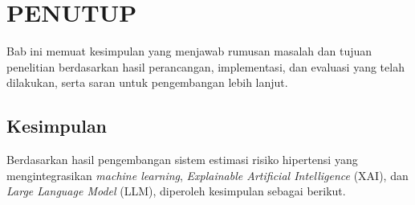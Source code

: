 \cleardoublepage
\chapter{PENUTUP}
\label{chap:penutup}

Bab ini memuat kesimpulan yang menjawab rumusan masalah dan tujuan penelitian berdasarkan hasil perancangan, implementasi, dan evaluasi yang telah dilakukan, serta saran untuk pengembangan lebih lanjut.

\section{Kesimpulan}
Berdasarkan hasil pengembangan sistem estimasi risiko hipertensi yang mengintegrasikan \textit{machine learning}, \textit{Explainable Artificial Intelligence} (XAI), dan \textit{Large Language Model} (LLM), diperoleh kesimpulan sebagai berikut.

